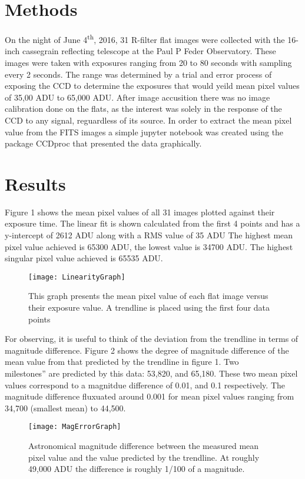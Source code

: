 \documentclass{article}
\begin{document}
\section{Methods}
On the night of June 4\textsuperscript{th}, 2016, 31 R-filter flat images were collected with the 16-inch cassegrain reflecting telescope at the Paul P Feder Observatory. These images were taken with exposures ranging from 20 to 80 seconds with sampling every 2 seconds. The range was determined by a trial and error process of exposing the CCD to determine the exposures that would yeild mean pixel values of 35,00 ADU to 65,000 ADU. After image accusition there was no image calibration done on the flats, as the interest was solely in the response of the CCD to any signal, reguardless of its source. In order to extract the mean pixel value from the FITS images a simple jupyter notebook was created using the package CCDproc that presented the data graphically\cite{jupyter}\cite{ccdproc}.

\section{Results}
Figure 1 shows the mean pixel values of all 31 images plotted against their exposure time. The linear fit is shown calculated from the first 4 points and has a y-intercept of 2612 ADU along with a RMS value of 35 ADU The highest mean pixel value achieved is 65300 ADU, the lowest value is 34700 ADU. The highest singular pixel value achieved is 65535 ADU.

\begin{figure}[h]
	\centering
		\texttt{[image: LinearityGraph]}
	\caption{This graph presents the mean pixel value of each flat image versus their exposure value. A trendline is placed using the first four data points}
\end{figure}

For observing, it is useful to think of the deviation from the trendline in terms of magnitude difference. Figure 2 shows the degree of magnitude difference of the mean value from that predicted by the trendline in figure 1. Two \\milestones'' are predicted by this data: 53,820, and 65,180. These two mean pixel values correspond to a magnitdue difference of 0.01, and 0.1 respectively. The magnitude difference fluxuated around 0.001 for mean pixel values ranging from 34,700 (smallest mean) to 44,500.

\begin{figure}[h]
	\centering
		\texttt{[image: MagErrorGraph]}
	\caption{Astronomical magnitude difference between the measured mean pixel value and the value predicted by the trendline. At roughly 49,000 ADU the difference is roughly 1/100 of a magnitude.}
\end{figure}
\end{document}
